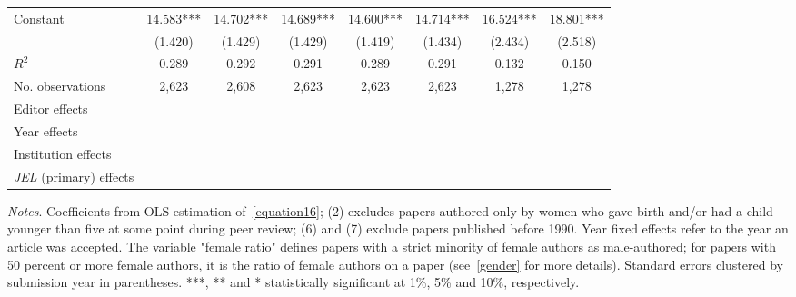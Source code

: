 \begin{table}
\begin{adjustwidth}{-0.085cm}{}
\begin{threeparttable}
\begin{tabular}{p{2.64cm}SSSSSSS}
            Constant                      &      14.583***&      14.702***&      14.689***&      14.600***&      14.714***&      16.524***&      18.801***\\
                                          &     (1.420)   &     (1.429)   &     (1.429)   &     (1.419)   &     (1.434)   &     (2.434)   &     (2.518)   \\
            \midrule
            \(R^2\)                       &       0.289   &       0.292   &       0.291   &       0.289   &       0.291   &       0.132   &       0.150   \\
            No. observations              &       2,623   &       2,608   &       2,623   &       2,623   &       2,623   &       1,278   &       1,278   \\
            \midrule
            Editor effects       &           {}   &           {}   &           {}   &           {}   &           {}   &           {}   &           {}   \\
            Year effects                  &           {}   &           {}   &           {}   &           {}   &           {}   &           {}   &           {}   \\
            Institution effects           &           {}   &           {}   &           {}   &           {}   &           {}   &           {}   &           {}   \\
            \textit{JEL} (primary) effects&               &               &               &               &               &               &           {}   \\
            \bottomrule
        \end{tabular}
        \begin{tablenotes}
            \tiny
            \item \textit{Notes}. Coefficients from OLS estimation of~\autoref{equation16}; (2) excludes papers authored only by women who gave birth and/or had a child younger than five at some point during peer review; (6) and (7) exclude papers published before 1990. Year fixed effects refer to the year an article was accepted. The variable "female ratio" defines papers with a strict minority of female authors as male-authored; for papers with 50 percent or more female authors, it is the ratio of female authors on a paper (see~\autoref{gender} for more details). Standard errors clustered by submission year in parentheses. ***, ** and * statistically significant at 1\%, 5\% and 10\%, respectively.
        \end{tablenotes}
    \end{threeparttable}
    \end{adjustwidth}
\end{table}